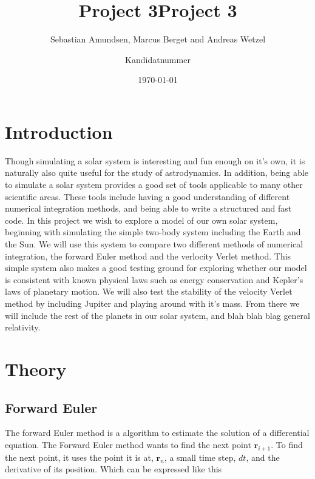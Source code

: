 \documentclass{article}
\begin{document}
\title{Project 3}
\author{Sebastian Amundsen, Marcus Berget and Andreas Wetzel}



\title{Project 3}
\author{Kandidatnummer}

\date{\today}

\maketitle

\begin{abstract}

\end{abstract}

\begin{multicols}{2}


\section{Introduction}

Though simulating a solar system is interesting and fun enough on it's own, it is naturally also quite useful for the study of astrodynamics. In addition, being able to simulate a solar system provides a good set of tools applicable to many other scientific areas. These tools include having a good understanding of different numerical integration methods, and being able to write a structured and fast code. In this project we wish to explore a model of our own solar system, beginning with simulating the simple two-body system including the Earth and the Sun. We will use this system to compare two different methods of numerical integration, the forward Euler method and the verlocity Verlet method. This simple system also makes a good testing ground for exploring whether our model is consistent with known physical laws such as energy conservation and Kepler's laws of planetary motion. We will also test the stability of the velocity Verlet method by including Jupiter and playing around with it's mass. From there we will include the rest of the planets in our solar system, and blah blah blag general relativity. 

\section{Theory}


\subsection{Forward Euler}
The forward Euler method is a algorithm to estimate the solution of a differential equation. The Forward Euler method wants to find the next point $\mathbf{r}_{i+1}$. To find the next point, it uses the point it is at, $\mathbf{r}_{n}$, a small time step, $dt$, and the derivative of its position. Which can be expressed like this


\end{multicols}
\end{document}
